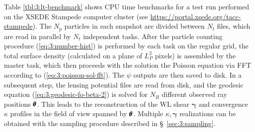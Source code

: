Table \ref{tbl:3:lt-benchmark} shows CPU time benchmarks for a test run performed on the XSEDE Stampede computer cluster (see \url{https://portal.xsede.org/tacc-stampede}). The $N_p$ particles in each snapshot are divided between $N_t$ files, which are read in parallel by $N_t$ independent tasks. After the particle counting procedure (\ref{eq:3:number-hist}) is performed by each task on the regular grid, the total surface density (calculated on a plane of $L_P^2$ pixels) is assembled by the master task, which then proceeds with the solution the Poisson equation via FFT according to (\ref{eq:3:poisson-sol-fft}). The $\psi$ outputs are then saved to disk. In a subsequent step, the lensing potential files are read from disk, and the geodesic equation (\ref{eq:3:geodesic-fo-beta-2}) is solved for $N_R$ different observed ray positions $\pmb{\theta}$. This leads to the reconstruction of the WL shear $\pmb{\gamma}$ and convergence $\kappa$ profiles in the field of view spanned by $\pmb{\theta}$. Multiple $\kappa,\pmb{\gamma}$ realizations can be obtained with the sampling procedure described in \S~\ref{sec:3:sampling}. 
%
